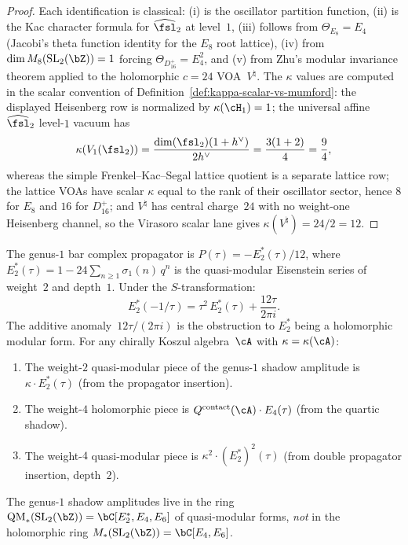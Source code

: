 \begin{proof}
Each identification is classical: (i) is the oscillator
partition function, (ii) is the Kac character formula for
$\widehat{\fsl}_2$ at level~$1$,
(iii) follows from $\Theta_{E_8} = E_4$
(Jacobi's theta function identity for the $E_8$ root lattice),
(iv) from $\dim M_8(\mathrm{SL}_2(\bZ)) = 1$ forcing
$\Theta_{D_{16}^+} = E_4^2$,
and (v) from Zhu's modular invariance theorem applied to the
holomorphic $c = 24$ VOA~$V^\natural$.
The $\kappa$ values are computed in the scalar convention of
Definition~\ref{def:kappa-scalar-vs-mumford}: the displayed
Heisenberg row is normalized by $\kappa(\cH_1)=1$; the universal
affine $\widehat{\fsl}_2$ level-$1$ vacuum has
\[
\kappa(V_1(\fsl_2))
=\frac{\dim(\fsl_2)(1+h^\vee)}{2h^\vee}
=\frac{3(1+2)}{4}
=\frac94,
\]
whereas the simple Frenkel--Kac--Segal lattice quotient is a separate
lattice row; the lattice VOAs have scalar $\kappa$ equal to the rank
of their oscillator sector, hence $8$ for $E_8$ and $16$ for
$D_{16}^+$; and $V^\natural$ has central charge~$24$ with no
weight-one Heisenberg channel, so the Virasoro scalar lane gives
$\kappa(V^\natural)=24/2=12$.
\end{proof}

\begin{proposition}%
\label{prop:quasi-modular-propagator}%
%
%
The genus-$1$ bar complex propagator is
$P(\tau) = -E_2^*(\tau)/12$, where
$E_2^*(\tau) = 1 - 24\sum_{n \geq 1} \sigma_1(n)\,q^n$
is the quasi-modular Eisenstein series of weight~$2$ and depth~$1$.
Under the $S$-transformation:
\begin{equation}\label{eq:e2-star-anomaly}
E_2^*(-1/\tau) = \tau^2\,E_2^*(\tau) + \frac{12\tau}{2\pi i}.
\end{equation}
The additive anomaly~$12\tau/(2\pi i)$ is the obstruction to
$E_2^*$ being a holomorphic modular form. For any chirally Koszul
algebra~$\cA$ with $\kappa = \kappa(\cA)$:
\begin{enumerate}[label=\textup{(\roman*)}]
\item The weight-$2$ quasi-modular piece of the genus-$1$ shadow
amplitude is $\kappa \cdot E_2^*(\tau)$
\textup{(}from the propagator insertion\textup{)}.
\item The weight-$4$ holomorphic piece is
$Q^{\mathrm{contact}}(\cA) \cdot E_4(\tau)$
\textup{(}from the quartic shadow\textup{)}.
\item The weight-$4$ quasi-modular piece is
$\kappa^2 \cdot (E_2^*)^2(\tau)$
\textup{(}from double propagator insertion, depth~$2$\textup{)}.
\end{enumerate}
The genus-$1$ shadow amplitudes live in the ring
$\mathrm{QM}_*(\mathrm{SL}_2(\bZ)) = \bC[E_2^*, E_4, E_6]$
of quasi-modular forms, \emph{not} in the holomorphic ring
$M_*(\mathrm{SL}_2(\bZ)) = \bC[E_4, E_6]$.
\end{proposition}


